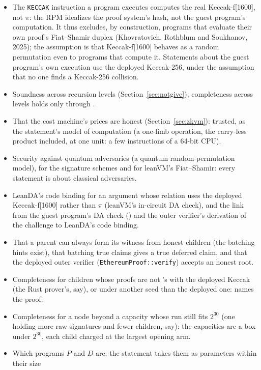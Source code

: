 \documentclass[11pt]{article}
\begin{document}
\begin{itemize}
\item The \texttt{KECCAK} instruction a program executes computes the real Keccak-f[1600], not
$\pi$: the RPM idealizes the proof system's hash, not the guest program's computation. It thus
excludes, by construction, programs that evaluate their own proof's Fiat--Shamir duplex
(Khovratovich, Rothblum and Soukhanov, 2025); the assumption is that Keccak-f[1600] behaves as a
random permutation even to programs that compute it. Statements
about the guest program's own execution use the deployed Keccak-256, under the assumption that no
one finds a Keccak-256 collision.
\item Soundness across recursion levels (Section~\ref{sec:notgive}); completeness across levels
holds only through .
\item That the cost machine's prices are honest (Section~\ref{sec:zkvm}): trusted, as the
statement's model of computation (a one-limb operation, the carry-less product included, at one
unit: a few instructions of a 64-bit CPU).
\item Security against quantum adversaries (a quantum random-permutation model), for the
signature schemes and for leanVM's Fiat--Shamir: every statement is about classical adversaries.
\item LeanDA's code binding for an argument whose relation uses the deployed Keccak-f[1600] rather than $\pi$ (leanVM's in-circuit DA check), and the link from the guest
program's DA check () and the outer verifier's derivation of the challenge to
LeanDA's code binding.
\item That a parent can always form its witness from honest children (the batching hints exist),
that batching true claims gives a true deferred claim, and that the deployed outer verifier
(\texttt{EthereumProof::verify}) accepts an honest root.
\item Completeness for children whose proofs are not 's with the
deployed Keccak (the Rust prover's, say), or under another seed than the deployed one:
 names the proof.
\item Completeness for a node beyond a capacity whose run still fits $2^{30}$ (one holding more raw signatures and fewer children, say): the capacities are a box under $2^{30}$, each child charged at the largest opening arm.
\item Which programs $P$ and $D$ are: the statement takes them as parameters within their size

\end{itemize}
\end{document}
